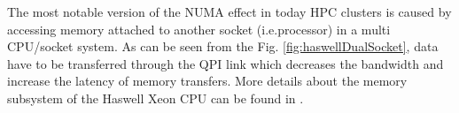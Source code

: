 The most notable version of the NUMA effect in today HPC clusters is caused by accessing memory attached to another 
socket (i.e.processor) in a multi CPU/socket system. As can be seen from the Fig. \ref{fig:haswellDualSocket}, 
data have to be transferred through the QPI link which decreases the bandwidth and increase the latency of memory transfers. More details about the memory subsystem of the Haswell Xeon CPU can be found in \cite{molka2015cache}.